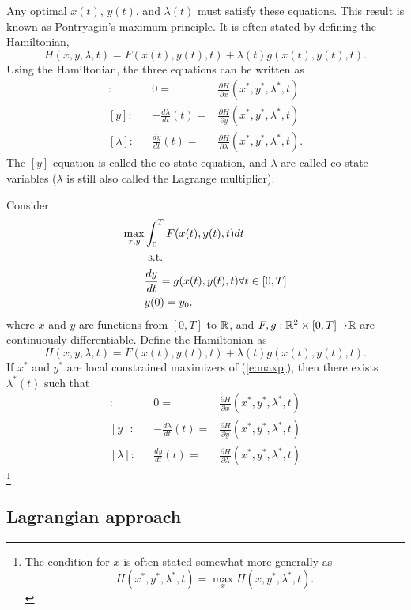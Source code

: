 Any optimal $x(t)$, $y(t)$, and $\lambda(t)$ must satisfy these
equations. This result is known as Pontryagin's maximum principle. It
is often stated by defining the Hamiltonian, 
\[ H(x,y,\lambda,t) = F(x(t),y(t),t) + \lambda(t) g(x(t),y(t),t). \]
Using the Hamiltonian, the three equations can be written as
\begin{align*}
  [x]: && 0 = & \frac{\partial H}{\partial x}(x^*,y^*,\lambda^*,t)
  \\
  [y]: && -\frac{d\lambda}{dt}(t) = & \frac{\partial H}{\partial y}(x^*,y^*,\lambda^*,t) \\
  [\lambda]: && \frac{dy}{dt}(t) = & \frac{\partial H}{\partial
    \lambda}(x^*,y^*,\lambda^*,t).
\end{align*}
The $[y]$ equation is called the co-state equation, and $\lambda$ are
called co-state variables ($\lambda$ is still also called the Lagrange
multiplier).
\begin{theorem}\label{thm:optcon}
  Consider 
  \begin{align}
    \max_{x,y} & \int_0^T F(x(t),y(t),t) dt \notag \\
    & \text{ s.t.} \\
    &  \frac{d y}{dt} = g(x(t),y(t),t) \forall t \in
    [0,T] \label{e:maxp} \\ 
    & y(0) = y_0. \notag
  \end{align}
  where $x$ and $y$ are functions from $[0,T]$ to $\mathbb{R}$, and $F,g:\mathbb{R}^2
  \times [0,T] {\rightarrow} \mathbb{R}$ are continuously differentiable. Define the
  Hamiltonian as
  \[ H(x,y,\lambda,t) = F(x(t),y(t),t) + \lambda(t) g(x(t),y(t),t). \]
  If $x^*$ and $y^*$ are local constrained maximizers of
  (\ref{e:maxp}), then there exists
  $\lambda^*(t)$ such that 
  \begin{align*}
    [x]: && 0 = & \frac{\partial H}{\partial x}(x^*,y^*,\lambda^*,t)
    \\
    [y]: && -\frac{d\lambda}{dt}(t) = & \frac{\partial H}{\partial y}(x^*,y^*,\lambda^*,t) \\
    [\lambda]: && \frac{dy}{dt}(t) = & \frac{\partial H}{\partial
      \lambda}(x^*,y^*,\lambda^*,t)
  \end{align*}\footnote{The condition for $x$ is often stated somewhat
    more generally as
    \[ H(x^*,y^*,\lambda^*,t) = \max_x H(x,y^*,\lambda^*,t). \]
  }
\end{theorem}

\subsection{Lagrangian approach}


